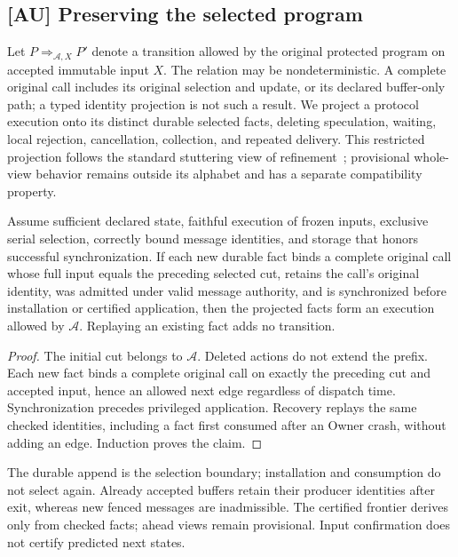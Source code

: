 \subsection{[AU] Preserving the selected program}
\label{subsec:native_refinement}
Let $P \mathrel{\Rightarrow_{\mathcal A,X}} P'$ denote a transition allowed
by the original protected program on accepted immutable input $X$.
The relation may be nondeterministic. A complete original call includes
its original selection and update, or its declared buffer-only path;
a typed identity projection is not such a result. We project a protocol
execution onto its distinct durable selected facts, deleting speculation,
waiting, local rejection, cancellation, collection, and repeated delivery.
This restricted projection follows the standard stuttering view of
refinement~\cite{abadi1991refinement}; provisional whole-view behavior
remains outside its alphabet and has a separate compatibility property.

\begin{proposition}
\label{prop:refinement}
Assume sufficient declared state, faithful execution of frozen inputs,
exclusive serial selection, correctly bound message identities, and
storage that honors successful synchronization. If each new durable fact
binds a complete original call whose full input equals the preceding
selected cut, retains the call's original identity, was admitted under
valid message authority, and is synchronized before installation or certified
application, then the projected facts form an execution allowed by
$\mathcal A$. Replaying an existing fact adds no transition.
\end{proposition}
\begin{proof}
The initial cut belongs to $\mathcal A$. Deleted actions do not extend
the prefix. Each new fact binds a complete original call on exactly the
preceding cut and accepted input, hence an allowed next edge regardless
of dispatch time. Synchronization precedes privileged application.
Recovery replays the same checked identities, including a fact first
consumed after an Owner crash, without adding an edge. Induction proves
the claim.
\end{proof}

The durable append is the selection boundary; installation and consumption
do not select again. Already accepted buffers retain their producer
identities after exit, whereas new fenced messages are inadmissible.
The certified frontier derives only from checked facts; ahead views remain
provisional. Input confirmation does not certify predicted next states.

